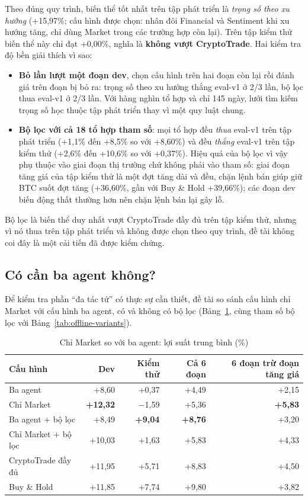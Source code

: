 Theo đúng quy trình, biến thể tốt nhất trên tập phát triển là \emph{trọng số theo xu hướng} (+15,97\%; cấu hình được
chọn: nhân đôi Financial và Sentiment khi xu hướng tăng, chỉ dùng Market trong các trường hợp còn lại). Trên tập kiểm
thử biến thể này chỉ đạt +0,00\%, nghĩa là \textbf{không vượt CryptoTrade}. Hai kiểm tra độ bền giải thích vì sao:
\begin{itemize}
  \item \textbf{Bỏ lần lượt một đoạn dev}, chọn cấu hình trên hai đoạn còn lại rồi đánh giá trên đoạn bị bỏ ra: trọng số
  theo xu hướng thắng eval-v1 ở 2/3 lần, bộ lọc thua eval-v1 ở 2/3 lần. Với hàng nghìn tổ hợp và chỉ 145 ngày, lưới tìm
  kiếm trọng số học thuộc tập phát triển thay vì một quy luật chung.
  \item \textbf{Bộ lọc với cả 18 tổ hợp tham số}: mọi tổ hợp đều \emph{thua} eval-v1 trên tập phát triển (+1,1\% đến
  +8,5\% so với +8,60\%) và đều \emph{thắng} eval-v1 trên tập kiểm thử (+2,6\% đến +10,6\% so với +0,37\%). Hiệu quả
  của bộ lọc vì vậy phụ thuộc vào giai đoạn thị trường chứ không phải vào tham số: giai đoạn tăng giá của tập kiểm thử
  là một đợt tăng dài và đều, chặn lệnh bán giúp giữ BTC suốt đợt tăng (+36,60\%, gần với Buy \& Hold +39,66\%); các
  đoạn dev biến động thất thường hơn nên chặn lệnh bán lại gây lỗ.
\end{itemize}
Bộ lọc là biến thể duy nhất vượt CryptoTrade đầy đủ trên tập kiểm thử, nhưng vì nó thua trên tập phát triển và không
được chọn theo quy trình, đề tài không coi đây là một cải tiến đã được kiểm chứng.

\subsection{Có cần ba agent không?}
Để kiểm tra phần ``đa tác tử'' có thực sự cần thiết, đề tài so sánh cấu hình chỉ Market với cấu hình ba agent, có và
không có bộ lọc (Bảng~\ref{tab:market-only}, cùng tham số bộ lọc với Bảng~\ref{tab:offline-variants}).

\begin{table}[H]
\centering
\caption{Chỉ Market so với ba agent: lợi suất trung bình (\%)}
\label{tab:market-only}
\small
\begin{tabular}{lrrrr}
\toprule
Cấu hình & Dev & Kiểm thử & Cả 6 đoạn & 6 đoạn trừ đoạn tăng giá \\
\midrule
Ba agent & +8,60 & +0,37 & +4,49 & +2,15 \\
Chỉ Market & \textbf{+12,32} & $-$1,59 & +5,36 & \textbf{+5,83} \\
Ba agent + bộ lọc & +8,49 & \textbf{+9,04} & \textbf{+8,76} & +3,20 \\
Chỉ Market + bộ lọc & +10,03 & +1,63 & +5,83 & +4,33 \\
\midrule
CryptoTrade đầy đủ & +11,95 & +5,71 & +8,83 & +4,50 \\
Buy \& Hold & +11,85 & +7,74 & +9,80 & +3,82 \\
\bottomrule
\end{tabular}
\end{table}

